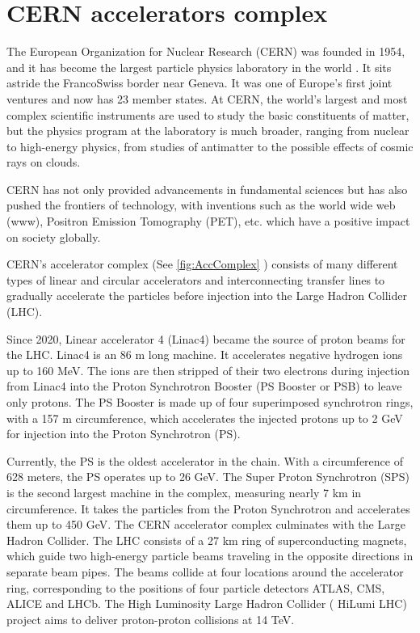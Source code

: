 \pagestyle{fancy}

\graphicspath{ {Figures/Chapter1_Overview/} }

\section{CERN accelerators complex}
\label{sec:CERN_acc_complex}

The European Organization for Nuclear Research (CERN) was founded in 1954, and it has become the largest particle physics laboratory in the world \parencite*[][]{ref:CernWebsite}. It sits astride the FrancoSwiss border near Geneva. It was one of Europe's first joint ventures and now has 23 member states. At CERN, the world's largest and most complex scientific instruments are used to study the basic constituents of matter, but the physics program at the laboratory is much broader, ranging from nuclear to high-energy physics, from studies of antimatter to the possible effects of cosmic rays on clouds.

CERN has not only provided advancements in fundamental sciences but has also pushed the frontiers of technology, with inventions such as the world wide web (www), Positron Emission Tomography (PET), etc. which have a positive impact on society globally.

CERN's accelerator complex (See \ref{fig:AccComplex} ) consists of many different types of linear and circular accelerators and interconnecting transfer lines to gradually accelerate the particles before injection into the Large Hadron Collider (LHC). 

Since 2020, Linear accelerator 4 (Linac4) became the source of proton beams for the LHC. Linac4 is an 86 \si{\meter} long machine. It accelerates negative hydrogen ions up to 160 \si{\mega \electronvolt}. The ions are then stripped of their two electrons during injection from Linac4 into the Proton Synchrotron Booster (PS Booster or PSB) to leave only protons. The PS Booster is made up of four superimposed synchrotron rings, with a 157 \si{\meter} circumference, which accelerates the injected protons up to 2 GeV for injection into the Proton Synchrotron (PS). 

Currently, the PS is the oldest accelerator in the chain. With a circumference of 628 meters, the PS operates up to 26 \si{\giga \electronvolt}. The Super Proton Synchrotron (SPS) is the second largest machine in the complex, measuring nearly 7 \si{\kilo \meter} in circumference. It takes the particles from the Proton Synchrotron and accelerates them up to 450 \si{\giga \electronvolt}. The CERN accelerator complex culminates with the Large Hadron Collider. The LHC consists of a 27 \si{\kilo \meter} ring of superconducting magnets, which guide two high-energy particle beams traveling in the opposite directions in separate beam pipes. The beams collide at four locations around the accelerator ring, corresponding to the positions of four particle detectors ATLAS, CMS, ALICE and LHCb. The High Luminosity Large Hadron Collider ( HiLumi LHC) project aims to deliver proton-proton collisions at 14 \si{\tera \electronvolt}.

